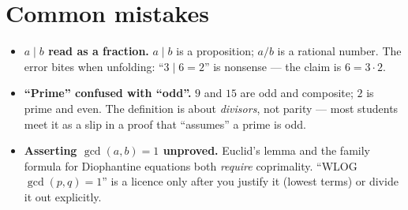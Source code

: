 \section{Common mistakes}
\begin{itemize}
\item \textbf{$a \mid b$ read as a fraction.} $a \mid b$ is a proposition;
$a/b$ is a rational number. The error bites when unfolding:
``$3 \mid 6 = 2$'' is nonsense --- the claim is $6 = 3\cdot2$.
\item \textbf{``Prime'' confused with ``odd''.} $9$ and $15$ are odd and
composite; $2$ is prime and even. The definition is about \emph{divisors},
not parity --- most students meet it as a slip in a proof that ``assumes''
a prime is odd.
\item \textbf{Asserting $\gcd(a,b)=1$ unproved.} Euclid's lemma and the
family formula for Diophantine equations both \emph{require} coprimality.
``WLOG $\gcd(p,q)=1$'' is a licence only after you justify it (lowest
terms) or divide it out explicitly.
\end{itemize}


